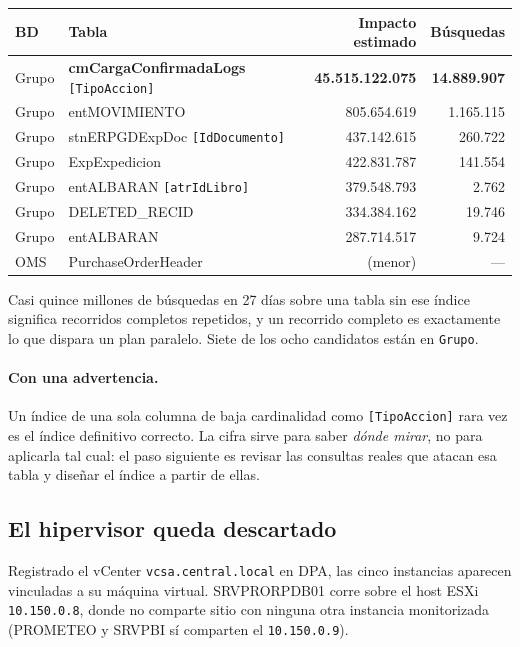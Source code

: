 \documentclass[11pt,a4paper]{article}
\newcommand{\cod}[1]{\texttt{\small #1}}
\newcommand{\critico}[1]{\textcolor{rojo}{\textbf{#1}}}
\begin{document}
\begin{table}[h]
\centering
\small
\begin{tabular}{llrr}
\toprule
\textbf{BD} & \textbf{Tabla} & \textbf{Impacto estimado} & \textbf{Búsquedas} \\
\midrule
Grupo & \critico{cmCargaConfirmadaLogs} \cod{[TipoAccion]} &
  \critico{45.515.122.075} & \critico{14.889.907} \\
Grupo & entMOVIMIENTO    &   805.654.619 & 1.165.115 \\
Grupo & stnERPGDExpDoc \cod{[IdDocumento]} & 437.142.615 & 260.722 \\
Grupo & ExpExpedicion    &   422.831.787 &   141.554 \\
Grupo & entALBARAN \cod{[atrIdLibro]} & 379.548.793 & 2.762 \\
Grupo & DELETED\_RECID   &   334.384.162 &    19.746 \\
Grupo & entALBARAN       &   287.714.517 &     9.724 \\
OMS   & PurchaseOrderHeader & (menor)    &       --- \\
\bottomrule
\end{tabular}
\end{table}

Casi quince millones de búsquedas en 27 días sobre una tabla sin ese índice
significa recorridos completos repetidos, y un recorrido completo es
exactamente lo que dispara un plan paralelo. Siete de los ocho candidatos
están en \cod{Grupo}.

\paragraph{Con una advertencia.} Un índice de una sola columna de baja
cardinalidad como \cod{[TipoAccion]} rara vez es el índice definitivo
correcto. La cifra sirve para saber \emph{dónde mirar}, no para aplicarla tal
cual: el paso siguiente es revisar las consultas reales que atacan esa tabla
y diseñar el índice a partir de ellas.

\subsection{El hipervisor queda descartado}
\label{sec:hipervisor}

Registrado el vCenter \cod{vcsa.central.local} en DPA, las cinco instancias
aparecen vinculadas a su máquina virtual. SRVPRORPDB01 corre sobre el host
ESXi \cod{10.150.0.8}, donde no comparte sitio con ninguna otra instancia
monitorizada (PROMETEO y SRVPBI sí comparten el \cod{10.150.0.9}).
\end{document}

